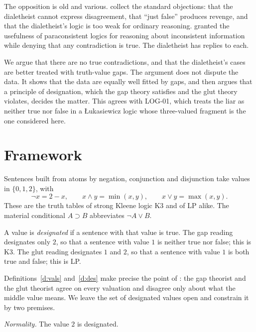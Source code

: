 \documentclass{situationist-preprint}
\begin{document}
The opposition is old and various. \citet{LittmannSimmons2004} collect the standard objections: that the dialetheist cannot express disagreement, that \enquote{just false} produces revenge, and that the dialetheist's logic is too weak for ordinary reasoning. \citet{Lewis1982} granted the usefulness of paraconsistent logics for reasoning about inconsistent information while denying that any contradiction is true. The dialetheist has replies to each.

We argue that there are no true contradictions, and that the dialetheist's cases are better treated with truth-value gaps. The argument does not dispute the data. It shows that the data are equally well fitted by gaps, and then argues that a principle of designation, which the gap theory satisfies and the glut theory violates, decides the matter. This agrees with LOG-01, which treats the liar as neither true nor false in a Łukasiewicz logic whose three-valued fragment is the one considered here.

\section{Framework}

\begin{definition}\label{d:vals}
Sentences built from atoms by negation, conjunction and disjunction take values in $\{0, 1, 2\}$, with
\[
\neg x = 2 - x, \qquad x \wedge y = \min(x, y), \qquad x \vee y = \max(x, y).
\]
These are the truth tables of strong Kleene logic K3 and of LP alike. The material conditional $A \supset B$ abbreviates $\neg A \vee B$.
\end{definition}

\begin{definition}\label{d:des}
A value is \emph{designated} if a sentence with that value is true. The gap reading designates only $2$, so that a sentence with value $1$ is neither true nor false; this is K3. The glut reading designates $1$ and $2$, so that a sentence with value $1$ is both true and false; this is LP.
\end{definition}

Definitions~\ref{d:vals} and~\ref{d:des} make precise the point of \citet{Parsons1990}: the gap theorist and the glut theorist agree on every valuation and disagree only about what the middle value means. We leave the set of designated values open and constrain it by two premises.

\begin{assumption}\label{a:norm}
\emph{Normality.} The value $2$ is designated.
\end{assumption}
\end{document}
